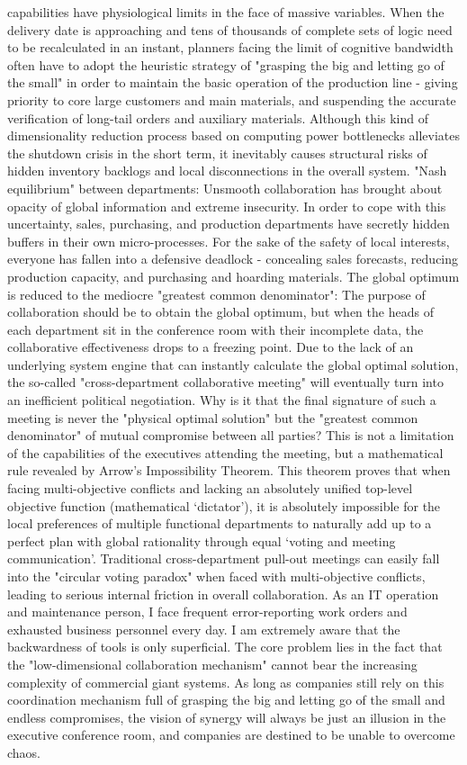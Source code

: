 \documentclass[11pt,a4paper]{article}
\begin{document}
capabilities have physiological limits in the face of massive variables. When the delivery date is approaching and tens of thousands of complete sets of logic need to be recalculated in an instant, planners facing the limit of cognitive bandwidth often have to adopt the heuristic strategy of "grasping the big and letting go of the small" in order to maintain the basic operation of the production line - giving priority to core large customers and main materials, and suspending the accurate verification of long-tail orders and auxiliary materials. Although this kind of dimensionality reduction process based on computing power bottlenecks alleviates the shutdown crisis in the short term, it inevitably causes structural risks of hidden inventory backlogs and local disconnections in the overall system. "Nash equilibrium" between departments: Unsmooth collaboration has brought about opacity of global information and extreme insecurity. In order to cope with this uncertainty, sales, purchasing, and production departments have secretly hidden buffers in their own micro-processes. For the sake of the safety of local interests, everyone has fallen into a defensive deadlock - concealing sales forecasts, reducing production capacity, and purchasing and hoarding materials. The global optimum is reduced to the mediocre "greatest common denominator": The purpose of collaboration should be to obtain the global optimum, but when the heads of each department sit in the conference room with their incomplete data, the collaborative effectiveness drops to a freezing point. Due to the lack of an underlying system engine that can instantly calculate the global optimal solution, the so-called "cross-department collaborative meeting" will eventually turn into an inefficient political negotiation. Why is it that the final signature of such a meeting is never the "physical optimal solution" but the "greatest common denominator" of mutual compromise between all parties? This is not a limitation of the capabilities of the executives attending the meeting, but a mathematical rule revealed by Arrow's Impossibility Theorem. This theorem proves that when facing multi-objective conflicts and lacking an absolutely unified top-level objective function (mathematical ‘dictator’), it is absolutely impossible for the local preferences of multiple functional departments to naturally add up to a perfect plan with global rationality through equal ‘voting and meeting communication’. Traditional cross-department pull-out meetings can easily fall into the "circular voting paradox" when faced with multi-objective conflicts, leading to serious internal friction in overall collaboration. As an IT operation and maintenance person, I face frequent error-reporting work orders and exhausted business personnel every day. I am extremely aware that the backwardness of tools is only superficial. The core problem lies in the fact that the "low-dimensional collaboration mechanism" cannot bear the increasing complexity of commercial giant systems. As long as companies still rely on this coordination mechanism full of grasping the big and letting go of the small and endless compromises, the vision of synergy will always be just an illusion in the executive conference room, and companies are destined to be unable to overcome chaos.
\end{document}
